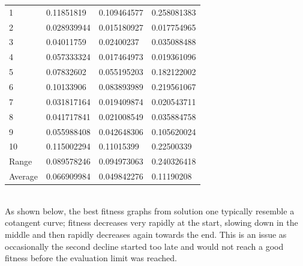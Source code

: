 \documentclass[sigconf]{acmart}
\begin{document}
%
%
\begin{supertabular}{@{}p{0.1\columnwidth}p{0.25\columnwidth}p{0.25\columnwidth}p{0.25\columnwidth}}
    1&0.11851819&0.109464577&0.258081383\\
    2&0.028939944&0.015180927&0.017754965\\
    3&0.04011759&0.02400237&0.035088488\\
    4&0.057333324&0.017464973&0.019361096\\
    5&0.07832602&0.055195203&0.182122002\\
    6&0.10133906&0.083893989&0.219561067\\
    7&0.031817164&0.019409874&0.020543711\\
    8&0.041717841&0.021008549&0.035884758\\
    9&0.055988408&0.042648306&0.105620024\\
    10&0.115002294&0.11015399&0.22500339\\
    Range&0.089578246&0.094973063&0.240326418\\
    Average&0.066909984&0.049842276&0.11190208\\
    
\end{supertabular}%
\\

As shown below, the best fitness graphs from solution one typically resemble a cotangent curve; fitness decreases very rapidly at the start, slowing down in the middle and then rapidly decreases again towards the end. This is an issue as occasionally the second decline started too late and would not reach a good fitness before the evaluation limit was reached.
\end{document}
